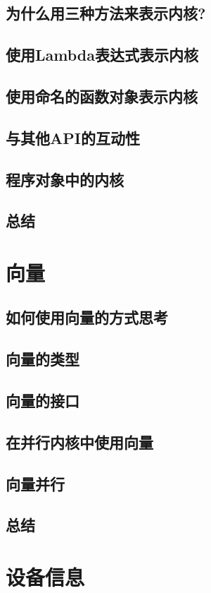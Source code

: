 \documentclass[11pt,a4paper,UTF8]{ctexart}
\begin{document}
		\subsection{为什么用三种方法来表示内核?}
		\subsection{使用Lambda表达式表示内核}
		\subsection{使用命名的函数对象表示内核}
		\subsection{与其他API的互动性}
		\subsection{程序对象中的内核}
		\subsection{总结}
	\section{向量}
		\subsection{如何使用向量的方式思考}
		\subsection{向量的类型}
		\subsection{向量的接口}
		\subsection{在并行内核中使用向量}
		\subsection{向量并行}
		\subsection{总结}
	\section{设备信息}
\end{document}

